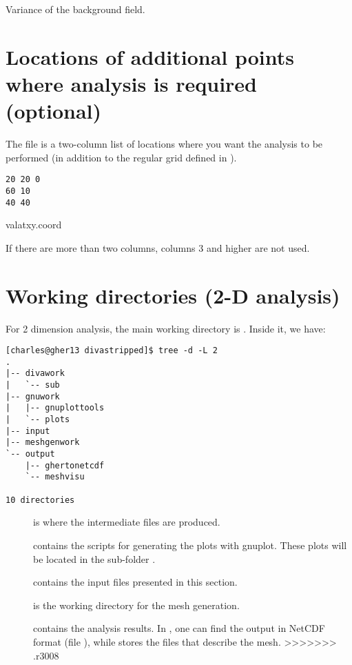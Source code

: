 Variance of the background field. 


\section[Additional points of analysis]{Locations of additional points where analysis is required (optional)}

The file  is a two-column list of locations where you want the analysis to be performed (in addition to the regular grid defined in ).  

\begin{exfile}[htpb]
\begin{footnotesize}
\texttt{20 20 0\\
60 10\\
40 40} 
\end{footnotesize}
\caption{valatxy.coord\label{ex:valatxy}}
\end{exfile}

If there are more than two columns, columns 3 and higher are not used.


\section{Working directories (2-D analysis)}

For 2 dimension analysis, the main working directory is . Inside it, we have:
\begin{lstlisting}[style=Bash]
[charles@gher13 divastripped]$ tree -d -L 2
.
|-- divawork
|   `-- sub
|-- gnuwork
|   |-- gnuplottools
|   `-- plots
|-- input
|-- meshgenwork
`-- output
    |-- ghertonetcdf
    `-- meshvisu

10 directories
\end{lstlisting}


\begin{description}

\item[] is where the intermediate files are produced.
\item[] contains the scripts for generating the plots with gnuplot. These plots will be located in the sub-folder .
\item[] contains the input files presented in this section.
\item[] is the working directory for the mesh generation.
\item[] contains the analysis results. In , one can find the output in NetCDF format (file ), while  stores the files that describe the mesh.
>>>>>>> .r3008
\end{description}